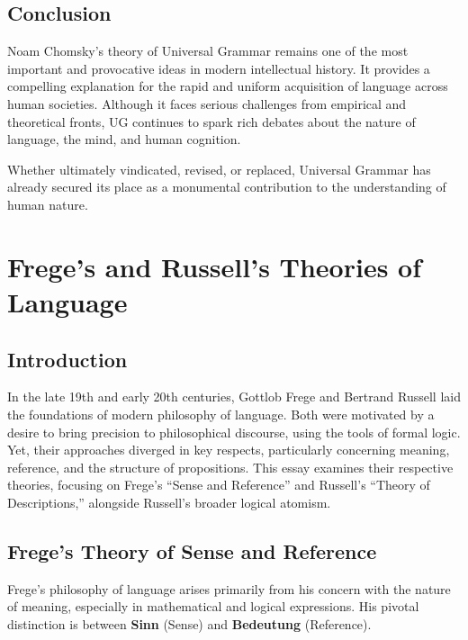 \documentclass[12pt]{article}
\begin{document}
\hypertarget{conclusion-3}{%
\subsection{Conclusion}\label{conclusion-3}}

Noam Chomsky's theory of Universal Grammar remains one of the most
important and provocative ideas in modern intellectual history. It
provides a compelling explanation for the rapid and uniform acquisition
of language across human societies. Although it faces serious challenges
from empirical and theoretical fronts, UG continues to spark rich
debates about the nature of language, the mind, and human cognition.

Whether ultimately vindicated, revised, or replaced, Universal Grammar
has already secured its place as a monumental contribution to the
understanding of human nature.

\hypertarget{freges-and-russells-theories-of-language}{%
\section{Frege's and Russell's Theories of
Language}\label{freges-and-russells-theories-of-language}}

\hypertarget{introduction-4}{%
\subsection{Introduction}\label{introduction-4}}

In the late 19th and early 20th centuries, Gottlob Frege and Bertrand
Russell laid the foundations of modern philosophy of language. Both were
motivated by a desire to bring precision to philosophical discourse,
using the tools of formal logic. Yet, their approaches diverged in key
respects, particularly concerning meaning, reference, and the structure
of propositions. This essay examines their respective theories, focusing
on Frege's ``Sense and Reference'' and Russell's ``Theory of
Descriptions,'' alongside Russell's broader logical atomism.

\hypertarget{freges-theory-of-sense-and-reference}{%
\subsection{Frege's Theory of Sense and
Reference}\label{freges-theory-of-sense-and-reference}}

Frege's philosophy of language arises primarily from his concern with
the nature of meaning, especially in mathematical and logical
expressions. His pivotal distinction is between \textbf{Sinn} (Sense)
and \textbf{Bedeutung} (Reference).
\end{document}
